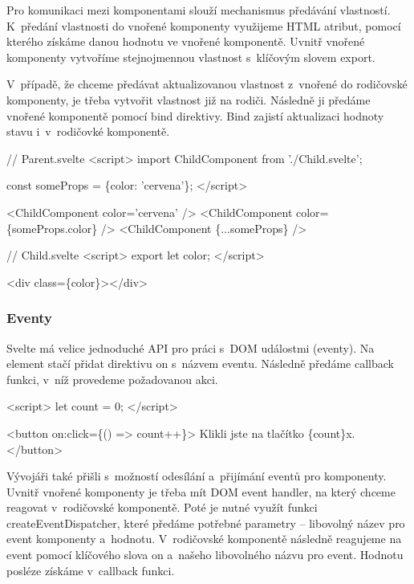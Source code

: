 Pro komunikaci mezi komponentami slouží mechanismus předávání vlastností. 
K~předání vlastnosti do vnořené komponenty využijeme HTML atribut, pomocí kterého získáme danou hodnotu ve vnořené komponentě.  
Uvnitř vnořené komponenty vytvoříme stejnojmennou vlastnost s~klíčovým slovem export.

V~případě, že chceme předávat aktualizovanou vlastnost z~vnořené do rodičovské komponenty, je třeba vytvořit vlastnost již na rodiči. 
Následně ji předáme vnořené komponentě pomocí bind direktivy. Bind zajistí aktualizaci hodnoty stavu i~v~rodičovké komponentě.\cite{svelte}

\begin{prog}
// Parent.svelte
<script>
  import ChildComponent from './Child.svelte';

  const someProps = \{color: 'cervena'\};
</script>

<ChildComponent color='cervena' />
<ChildComponent color=\{someProps.color\} />
<ChildComponent \{...someProps\} />

// Child.svelte
<script>
  export let color;
</script>

<div class=\{color\}></div>
\end{prog}

\subsubsection{Eventy} %

Svelte má velice jednoduché API pro práci s~DOM událostmi (eventy). Na element stačí přidat direktivu on s~názvem eventu. 
Následně předáme callback funkci, v~níž provedeme požadovanou akci.

\begin{prog}
<script>
  let count = 0;
</script>

<button on:click=\{() => count++\}>
  Klikli jste na tlačítko \{count\}x.
</button>
\end{prog}

Vývojáři také přišli s~možností odesílání a~přijímání eventů pro komponenty. 
Uvnitř vnořené komponenty je třeba mít DOM event handler, na který chceme reagovat v~rodičovské komponentě. 
Poté je nutné využít funkci createEventDispatcher, které předáme potřebné parametry -- libovolný název pro event komponenty a~hodnotu. 
V~rodičovské komponentě následně reagujeme na event pomocí klíčového slova on a~našeho libovolného názvu pro event. Hodnotu posléze získáme v~callback funkci.\cite{sveltehandbook,svelte}

